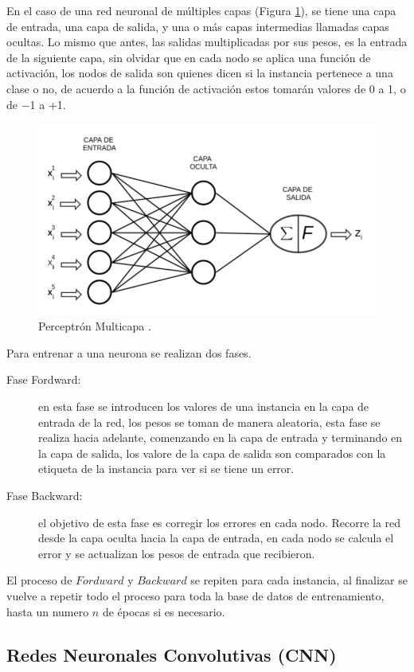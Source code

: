 En el caso de una red neuronal de múltiples capas (Figura \ref{fig:mlp}), se tiene una capa de entrada, una capa de salida, y una o más capas intermedias llamadas capas ocultas. Lo mismo que antes, las salidas multiplicadas por sus pesos, es la entrada de la siguiente capa, sin olvidar que en cada nodo se aplica una función de activación, los nodos de salida son quienes dicen si la instancia pertenece a una clase o no, de acuerdo a la función de activación estos tomarán valores de 0 a 1, o de −1 a +1.
\begin{figure}[ht]
 \centering
	\includegraphics[width=0.7\columnwidth]{chapter3/mlp.png}
 \caption{Perceptrón Multicapa \cite{aggarwal2015data}.}
 \label{fig:mlp}
\end{figure}

Para entrenar a una neurona se realizan dos fases.
 
 
 \begin{description}
 \item [Fase Fordward:] en esta fase se introducen los valores de una instancia en la capa de entrada de la red, los pesos se toman de manera aleatoria, esta fase se realiza hacia adelante, comenzando en la capa de entrada y terminando en la capa de salida, los valore de la capa de salida son comparados con la etiqueta de la instancia para ver si se tiene un error.
 

 \item [Fase Backward:] el objetivo de esta fase es corregir los errores en cada nodo. Recorre la red desde la capa oculta hacia la capa de entrada, en cada nodo se calcula el error y se actualizan los pesos de entrada que recibieron. 
 \end{description}
 
 El proceso de $Fordward$ y $Backward$ se repiten para cada instancia, al finalizar se vuelve a repetir todo el proceso para toda la base de datos de entrenamiento, hasta un numero $n$ de épocas si es necesario. 
 
\subsection{Redes Neuronales Convolutivas (CNN)}\label{sec:cnn}

